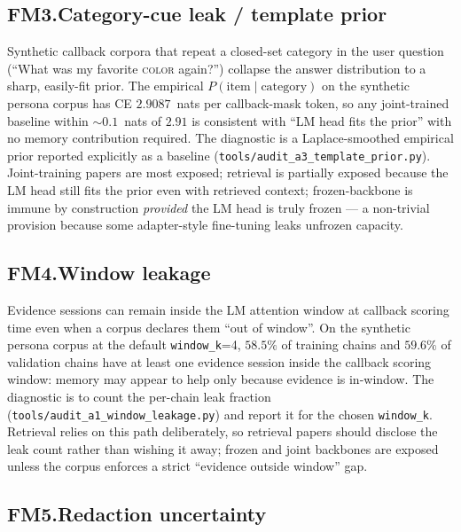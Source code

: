 \documentclass{article}
\begin{document}
\subsection{FM3.\enspace Category-cue leak / template prior}
\label{sec:fm3}

Synthetic callback corpora that repeat a closed-set category in the
user question (``What was my favorite \textsc{color} again?'')
collapse the answer distribution to a sharp, easily-fit prior.  The
empirical $P(\text{item} \mid \text{category})$ on the synthetic
persona corpus has CE $2.9087$~nats per callback-mask token, so any
joint-trained baseline within $\sim\!0.1$~nats of $2.91$ is
consistent with ``LM head fits the prior'' with no memory
contribution required.  The diagnostic is a Laplace-smoothed
empirical prior reported explicitly as a baseline
(\texttt{tools/audit\_a3\_template\_prior.py}).  Joint-training
papers are most exposed; retrieval is partially exposed because the
LM head still fits the prior even with retrieved context;
frozen-backbone is immune by construction \emph{provided} the LM
head is truly frozen --- a non-trivial provision because some
adapter-style fine-tuning leaks unfrozen capacity.

\subsection{FM4.\enspace Window leakage}
\label{sec:fm4}

Evidence sessions can remain inside the LM attention window at
callback scoring time even when a corpus declares them ``out of
window''.  On the synthetic persona corpus at the default
\texttt{window\_k}{=}4, $58.5\%$ of training chains and $59.6\%$ of
validation chains have at least one evidence session inside the
callback scoring window: memory may appear to help only because
evidence is in-window.  The diagnostic is to count the per-chain
leak fraction (\texttt{tools/audit\_a1\_window\_leakage.py}) and
report it for the chosen \texttt{window\_k}.  Retrieval relies on
this path deliberately, so retrieval papers should disclose the leak
count rather than wishing it away; frozen and joint backbones are
exposed unless the corpus enforces a strict ``evidence outside
window'' gap.

\subsection{FM5.\enspace Redaction uncertainty}
\label{sec:fm5}
\end{document}

